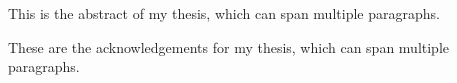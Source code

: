 
 {This is the abstract of my thesis, which can span multiple paragraphs.}

 {These are the acknowledgements for my thesis, which can span multiple paragraphs.}
